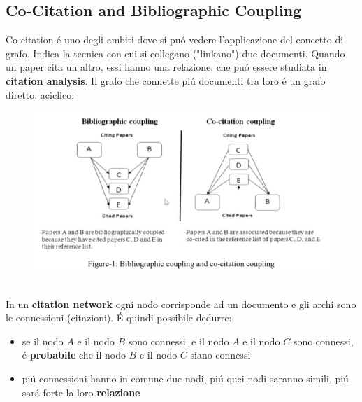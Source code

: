 \subsection{Co-Citation and Bibliographic Coupling}
Co-citation é uno degli ambiti dove si puó vedere l'applicazione del concetto di grafo. Indica la tecnica con cui si collegano ("linkano") due documenti. Quando un paper cita un altro, essi hanno una relazione, che puó essere studiata in \textbf{citation analysis}. Il grafo che connette piú documenti tra loro é un grafo diretto, aciclico: 
\\
\begin{figure}[th]
    \centering
    \includegraphics[scale=0.5]{GraphImportance//img/DAG.png}
\end{figure}
\\
In un \textbf{citation network} ogni nodo corrisponde ad un documento e gli archi sono le connessioni (citazioni). É quindi possibile dedurre:
\begin{itemize}
    \item se il nodo $A$ e il nodo $B$ sono connessi, e il nodo $A$ e il nodo $C$ sono connessi, é \textbf{probabile} che il nodo $B$ e il nodo $C$ siano connessi
    \item piú connessioni hanno in comune due nodi, piú quei nodi saranno simili, piú sará forte la loro \textbf{relazione}
\end{itemize}
